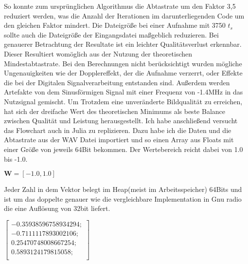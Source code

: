 \begin{multicols*}{2}
    So konnte zum ursprünglichen Algorithmus die Abtastrate um den Faktor 3,5 reduziert werden, was die Anzahl der Iterationen im darunterliegenden Code um den gleichen Faktor mindert. Die Dateigröße bei einer Aufnahme mit 3750 \( t_s \) sollte auch die Dateigröße der Eingangsdatei maßgeblich reduzieren. Bei genauerer Betrachtung der Resultate ist ein leichter Qualitätsverlust erkennbar. Dieser Resultiert womöglich aus der Nutzung der theoretischen Mindestabtastrate. Bei den Berechnungen nicht berücksichtigt wurden mögliche Ungenauigkeiten wie der Dopplereffekt, der die Aufnahme verzerrt, oder Effekte die bei der Digitalen Signalverarbeitung entstanden sind. Außerdem werden Artefakte von dem Sinusförmigen Signal mit einer Frequenz von -1.4MHz in das Nutzsignal gemischt. Um Trotzdem eine unveränderte Bildqualität zu erreichen, hat sich der dreifache Wert des theoretischen Minimums als beste Balance zwischen Qualität und Leistung herausgestellt.
    Ich habe anschließend versucht das Flowchart auch in Julia zu replizieren. Dazu habe ich die Daten und die Abtastrate aus der WAV Datei importiert und so einen Array aus Floats mit einer Größe von jeweils 64Bit bekommen. Der Wertebereich reicht dabei von 1.0 bis -1.0.
   
    \begin{math}
        \mathbf{W} =[-1.0, 1.0]
    \end{math}

    Jeder Zahl in dem Vektor belegt im Heap(meist im Arbeitsspeicher) 64Bits und ist um das doppelte genauer wie die vergleichbare Implementation in Gnu radio die eine Auflösung von 32bit liefert. 

    \begin{math}
        \begin{bmatrix}
            -0.35938596758934294;\\
            -0.7111117893002106;\\
            0.25470748008667254;\\
            0.5893124179815058;\\
        \end{bmatrix}
    \end{math}


\end{multicols*}
